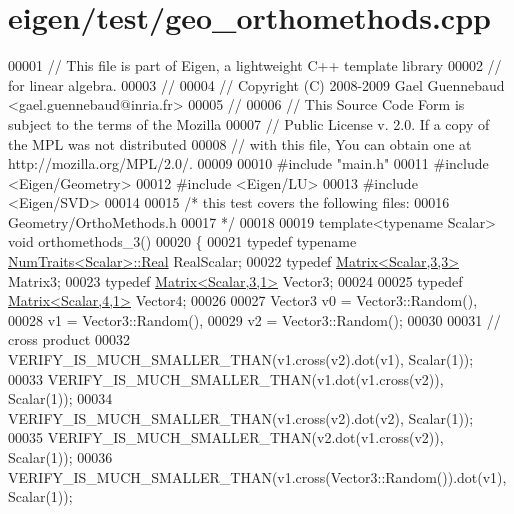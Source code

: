\hypertarget{eigen_2test_2geo__orthomethods_8cpp_source}{}\section{eigen/test/geo\+\_\+orthomethods.cpp}
\label{eigen_2test_2geo__orthomethods_8cpp_source}

\begin{DoxyCode}
00001 \textcolor{comment}{// This file is part of Eigen, a lightweight C++ template library}
00002 \textcolor{comment}{// for linear algebra.}
00003 \textcolor{comment}{//}
00004 \textcolor{comment}{// Copyright (C) 2008-2009 Gael Guennebaud <gael.guennebaud@inria.fr>}
00005 \textcolor{comment}{//}
00006 \textcolor{comment}{// This Source Code Form is subject to the terms of the Mozilla}
00007 \textcolor{comment}{// Public License v. 2.0. If a copy of the MPL was not distributed}
00008 \textcolor{comment}{// with this file, You can obtain one at http://mozilla.org/MPL/2.0/.}
00009 
00010 \textcolor{preprocessor}{#include "main.h"}
00011 \textcolor{preprocessor}{#include <Eigen/Geometry>}
00012 \textcolor{preprocessor}{#include <Eigen/LU>}
00013 \textcolor{preprocessor}{#include <Eigen/SVD>}
00014 
00015 \textcolor{comment}{/* this test covers the following files:}
00016 \textcolor{comment}{   Geometry/OrthoMethods.h}
00017 \textcolor{comment}{*/}
00018 
00019 \textcolor{keyword}{template}<\textcolor{keyword}{typename} Scalar> \textcolor{keywordtype}{void} orthomethods\_3()
00020 \{
00021   \textcolor{keyword}{typedef} \textcolor{keyword}{typename} \hyperlink{group___core___module_struct_eigen_1_1_num_traits}{NumTraits<Scalar>::Real} RealScalar;
00022   \textcolor{keyword}{typedef} \hyperlink{group___core___module_class_eigen_1_1_matrix}{Matrix<Scalar,3,3>} Matrix3;
00023   \textcolor{keyword}{typedef} \hyperlink{group___core___module}{Matrix<Scalar,3,1>} Vector3;
00024 
00025   \textcolor{keyword}{typedef} \hyperlink{group___core___module_class_eigen_1_1_matrix}{Matrix<Scalar,4,1>} Vector4;
00026 
00027   Vector3 v0 = Vector3::Random(),
00028           v1 = Vector3::Random(),
00029           v2 = Vector3::Random();
00030 
00031   \textcolor{comment}{// cross product}
00032   VERIFY\_IS\_MUCH\_SMALLER\_THAN(v1.cross(v2).dot(v1), Scalar(1));
00033   VERIFY\_IS\_MUCH\_SMALLER\_THAN(v1.dot(v1.cross(v2)), Scalar(1));
00034   VERIFY\_IS\_MUCH\_SMALLER\_THAN(v1.cross(v2).dot(v2), Scalar(1));
00035   VERIFY\_IS\_MUCH\_SMALLER\_THAN(v2.dot(v1.cross(v2)), Scalar(1));
00036   VERIFY\_IS\_MUCH\_SMALLER\_THAN(v1.cross(Vector3::Random()).dot(v1), Scalar(1));

\end{DoxyCode}
